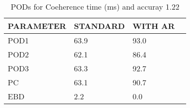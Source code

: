 \begin{table}[]
\begin{center}
\begin{tabular}{|l|l|l|l|}
\hline
\multicolumn{1}{|c|}{\cellcolor[HTML]{C0C0C0}\textbf{PARAMETER}} & \multicolumn{1}{c|}{\cellcolor[HTML]{C0C0C0}\textbf{STANDARD}} & \multicolumn{1}{c|}{\cellcolor[HTML]{C0C0C0}\textbf{WITH AR}} \\
\hline
\cellcolor[HTML]{C0C0C0}POD1  & 63.9                                & 93.0         \\
\cellcolor[HTML]{C0C0C0}POD2  & 62.1                                & 86.4         \\
\cellcolor[HTML]{C0C0C0}POD3  & 63.3                                & 92.7         \\
\cellcolor[HTML]{C0C0C0}PC    & 63.1                                  & 90.7           \\
\cellcolor[HTML]{C0C0C0}EBD   & 2.2                                 & 0.0          \\
\hline
\end{tabular}
\caption{PODs for Coeherence time (ms) and accuray 1.22}
\end{center}
\end{table}
